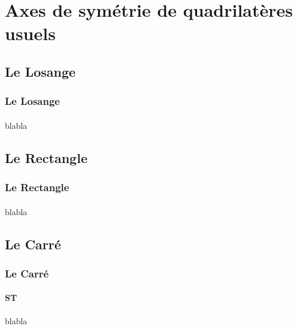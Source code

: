 \documentclass{beamer}
\begin{document}
\section{Axes de symétrie de quadrilatères usuels}

\subsection{Le Losange}

\begin{frame}
\frametitle{Le Losange}  
\framesubtitle{}
blabla
\end{frame}

\subsection{Le Rectangle}

\begin{frame}
\frametitle{Le Rectangle}  
\framesubtitle{}
blabla
\end{frame}

\subsection{Le Carré}

\begin{frame}
\frametitle{Le Carré}  
\framesubtitle{ST}
blabla
\end{frame}
\end{document}
